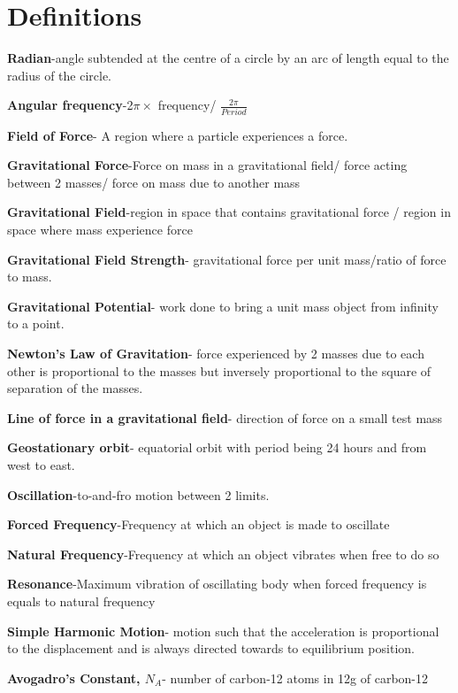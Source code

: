\documentclass{article}
\begin{document}
\section*{Definitions}
\begin{flushleft}

 \textbf{Radian}-angle subtended at the centre of a circle by an arc of length equal to the radius of the circle.
 
 \textbf{Angular frequency}-2$\pi \times$ frequency/ $\frac{2\pi}{Period}$
 
 \textbf{Field of Force}- A region where a particle experiences a force.
 
 \textbf{Gravitational Force}-Force on mass in a gravitational field/ force acting between 2 masses/ force on mass due to another mass
 
 \textbf{Gravitational Field}-region in space that contains gravitational force / region in space where mass experience force 
 
 \textbf{Gravitational Field Strength}- gravitational force per unit mass/ratio of force to mass.
 
 \textbf{Gravitational Potential}- work done to bring a unit mass object from infinity to a point.
 
 \textbf{Newton's Law of Gravitation}- force experienced by 2 masses due to each other is proportional to the masses but inversely proportional to the square of separation of the masses.
 
 \textbf{Line of force in a gravitational field}- direction of force on a small test mass
 
 \textbf{Geostationary orbit}- equatorial orbit with period being 24 hours and from west to east.
 
 \textbf{Oscillation}-to-and-fro motion between 2 limits.
 
 \textbf{Forced Frequency}-Frequency at which an object is made to oscillate
 
 \textbf{Natural Frequency}-Frequency at which an object vibrates when free to do so
 
 \textbf{Resonance}-Maximum vibration of oscillating body when forced frequency is equals to natural frequency
 
 \textbf{Simple Harmonic Motion}- motion such that the acceleration is proportional to the displacement and is always directed towards to equilibrium position.
 
 \textbf{Avogadro's Constant, $N_A$}- number of carbon-12 atoms in 12g of carbon-12
 

\end{flushleft}
\end{document}
